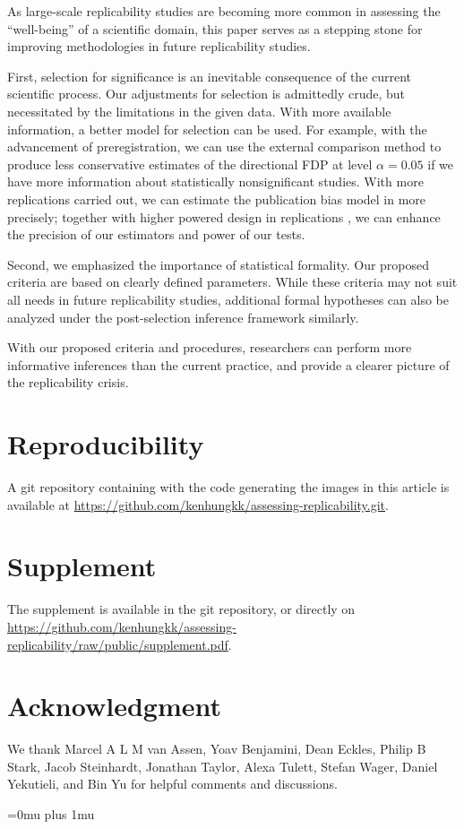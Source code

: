 \documentclass[11pt]{article}
\theoremstyle{definition}
\theoremstyle{custom}
\begin{document}
  As large-scale replicability studies are becoming more common in assessing the ``well-being'' of a scientific domain, this paper serves as a stepping stone for improving methodologies in future replicability studies.

  First, selection for significance is an inevitable consequence of the current scientific process. Our adjustments for selection is admittedly crude, but necessitated by the limitations in the given data. With more available information, a better model for selection can be used. For example, with the advancement of preregistration, we can use the external comparison method to produce less conservative estimates of the directional FDP at level $\alpha = 0.05$ if we have more information about statistically nonsignificant studies. With more replications carried out, we can estimate the publication bias model in \citet{Andrews:2018vh} more precisely; together with higher powered design in replications \citep[e.g.][]{Camerer:2018de}, we can enhance the precision of our estimators and power of our tests.

  Second, we emphasized the importance of statistical formality. Our proposed criteria are based on clearly defined parameters. While these criteria may not suit all needs in future replicability studies, additional formal hypotheses can also be analyzed under the post-selection inference framework similarly.

  With our proposed criteria and procedures, researchers can perform more informative inferences than the current practice, and provide a clearer picture of the replicability crisis.

\section*{Reproducibility}

  A git repository containing with the code generating the images in this article is available at \url{https://github.com/kenhungkk/assessing-replicability.git}.

\section*{Supplement}

  The supplement is available in the git repository, or directly on \url{https://github.com/kenhungkk/assessing-replicability/raw/public/supplement.pdf}.

\section*{Acknowledgment}

  We thank Marcel A L M van Assen, Yoav Benjamini, Dean Eckles, Philip B Stark, Jacob Steinhardt, Jonathan Taylor, Alexa Tulett, Stefan Wager, Daniel Yekutieli, and Bin Yu for helpful comments and discussions.

\Urlmuskip=0mu plus 1mu\relax


\end{document}
